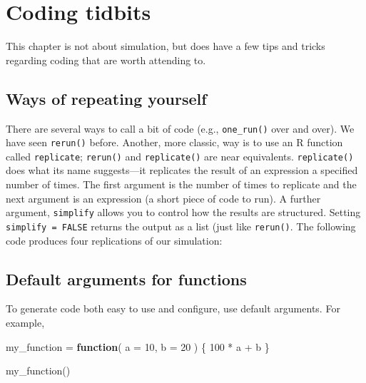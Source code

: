\documentclass[
]{book}
\newenvironment{Shaded}{\begin{snugshade}}{\end{snugshade}}
\newcommand{\AttributeTok}[1]{\textcolor[rgb]{0.77,0.63,0.00}{#1}}
\newcommand{\ControlFlowTok}[1]{\textcolor[rgb]{0.13,0.29,0.53}{\textbf{#1}}}
\newcommand{\DecValTok}[1]{\textcolor[rgb]{0.00,0.00,0.81}{#1}}
\newcommand{\FunctionTok}[1]{\textcolor[rgb]{0.00,0.00,0.00}{#1}}
\newcommand{\NormalTok}[1]{#1}
\newcommand{\OtherTok}[1]{\textcolor[rgb]{0.56,0.35,0.01}{#1}}
\newcommand{\SpecialCharTok}[1]{\textcolor[rgb]{0.00,0.00,0.00}{#1}}
\begin{document}
\hypertarget{on_functions}{%
\chapter{Coding tidbits}\label{on_functions}}

This chapter is not about simulation, but does have a few tips and tricks regarding coding that are worth attending to.

\hypertarget{repeating_oneself}{%
\section{Ways of repeating yourself}\label{repeating_oneself}}

There are several ways to call a bit of code (e.g., \texttt{one\_run()} over and over).
We have seen \texttt{rerun()} before.
Another, more classic, way is to use an R function called \texttt{replicate}; \texttt{rerun()} and \texttt{replicate()} are near equivalents.
\texttt{replicate()} does what its name suggests---it replicates the result of an expression a specified number of times. The first argument is the number of times to replicate and the next argument is an expression (a short piece of code to run). A further argument, \texttt{simplify} allows you to control how the results are structured. Setting \texttt{simplify\ =\ FALSE} returns the output as a list (just like \texttt{rerun()}.
The following code produces four replications of our simulation:

\hypertarget{default_arguments}{%
\section{Default arguments for functions}\label{default_arguments}}

To generate code both easy to use and configure, use default arguments.
For example,

\begin{Shaded}
\begin{Highlighting}[]
\NormalTok{my\_function }\OtherTok{=} \ControlFlowTok{function}\NormalTok{( }\AttributeTok{a =} \DecValTok{10}\NormalTok{, }\AttributeTok{b =} \DecValTok{20}\NormalTok{ ) \{}
     \DecValTok{100} \SpecialCharTok{*}\NormalTok{ a }\SpecialCharTok{+}\NormalTok{ b}
\NormalTok{\}}

\FunctionTok{my\_function}\NormalTok{()}
\end{Highlighting}
\end{Shaded}
\end{document}
